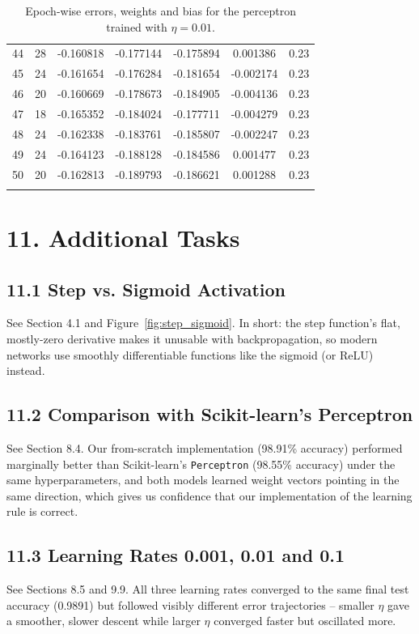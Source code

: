 \documentclass[11pt]{article}
\begin{document}
\begin{longtable}{|c|c|c|c|c|c|c|}
44 & 28 & -0.160818 & -0.177144 & -0.175894 & 0.001386 & 0.23 \\
45 & 24 & -0.161654 & -0.176284 & -0.181654 & -0.002174 & 0.23 \\
46 & 20 & -0.160669 & -0.178673 & -0.184905 & -0.004136 & 0.23 \\
47 & 18 & -0.165352 & -0.184024 & -0.177711 & -0.004279 & 0.23 \\
48 & 24 & -0.162338 & -0.183761 & -0.185807 & -0.002247 & 0.23 \\
49 & 24 & -0.164123 & -0.188128 & -0.184586 & 0.001477 & 0.23 \\
50 & 20 & -0.162813 & -0.189793 & -0.186621 & 0.001288 & 0.23 \\
\caption{Epoch-wise errors, weights and bias for the perceptron trained with $\eta=0.01$.}
\label{tab:epochwise}
\end{longtable}

\section*{11. Additional Tasks}

\subsection*{11.1 Step vs. Sigmoid Activation}
See Section 4.1 and Figure~\ref{fig:step_sigmoid}. In short: the step function's flat, mostly-zero derivative makes it unusable with backpropagation, so modern networks use smoothly differentiable functions like the sigmoid (or ReLU) instead.

\subsection*{11.2 Comparison with Scikit-learn's Perceptron}
See Section 8.4. Our from-scratch implementation (98.91\% accuracy) performed marginally better than Scikit-learn's \texttt{Perceptron} (98.55\% accuracy) under the same hyperparameters, and both models learned weight vectors pointing in the same direction, which gives us confidence that our implementation of the learning rule is correct.

\subsection*{11.3 Learning Rates 0.001, 0.01 and 0.1}
See Sections 8.5 and 9.9. All three learning rates converged to the same final test accuracy (0.9891) but followed visibly different error trajectories -- smaller $\eta$ gave a smoother, slower descent while larger $\eta$ converged faster but oscillated more.
\end{document}
